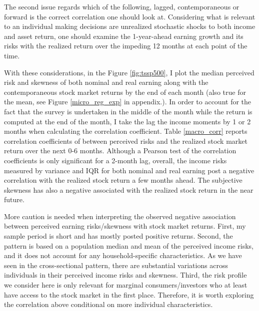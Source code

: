 \documentclass[12pt,notitlepage,onecolumn,aps,pra]{article}
\begin{document}
The second issue regards which of the following, lagged, contemporaneous
or forward is the correct correlation one should look at. Considering
what is relevant to an individual making decisions are unrealized
stochastic shocks to both income and asset return, one should examine
the 1-year-ahead earning growth and its risks with the realized return
over the impeding 12 months at each point of the time.

With these considerations, in the Figure \ref{fig:tssp500}, I plot the
median perceived risk and skewness of both nominal and real earning
along with the contemporaneous stock market returns by the end of each
month (also true for the mean, see Figure \ref{micro_reg_exp} in
appendix.). In order to account for the fact that the survey is
undertaken in the middle of the month while the return is computed at
the end of the month, I take the lag the income moments by 1 or 2 months
when calculating the correlation coefficient. Table \ref{macro_corr}
reports correlation coefficients of between perceived risks and the
realized stock market return over the next 0-6 months. Although a
Pearson test of the correlation coefficients is only significant for a
2-month lag, overall, the income risks measured by variance and IQR for
both nominal and real earning post a negative correlation with the
realized stock return a few months ahead. The subjective skewness has
also a negative associated with the realized stock return in the near
future.

More caution is needed when interpreting the observed negative
association between perceived earning risks/skewness with stock market
returns. First, my sample period is short and has mostly posted positive
returns. Second, the pattern is based on a population median and mean of
the perceived income risks, and it does not account for any
household-specific characteristics. As we have seen in the
cross-sectional pattern, there are substantial variations across
individuals in their perceived income risks and skewness. Third, the
risk profile we consider here is only relevant for marginal
consumers/investors who at least have access to the stock market in the
first place. Therefore, it is worth exploring the correlation above
conditional on more individual characteristics.


    \begin{figure*}[!ht]
        \begin{center}\end{center}
        \caption{Perceived Income Risks and Stock Market Return}
        \label{fig:tssp500}
    \end{figure*}
    
\end{document}
